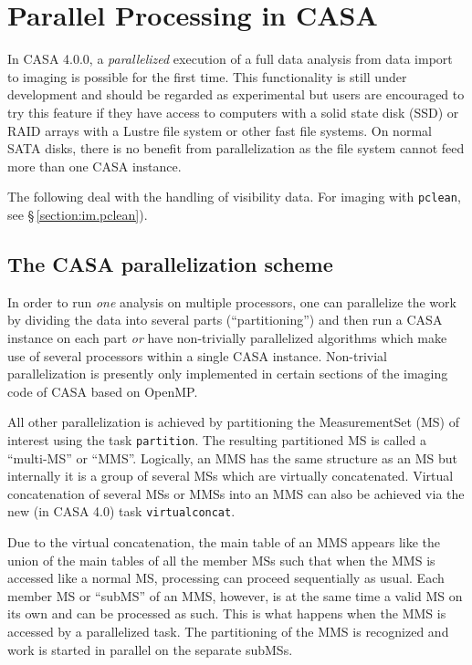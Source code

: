 
\chapter{Parallel Processing in CASA}
\label{chapter:parallel}

In CASA 4.0.0, a {\it parallelized} execution of a full data analysis from data import
to imaging is possible for the first time.
This functionality is still under development and should be regarded as experimental
but users are encouraged to try this feature if they have access to computers with
a solid state disk (SSD) or RAID arrays with a Lustre file system or other fast
file systems. On normal SATA disks, there is no benefit from parallelization as
the file system cannot feed more than one CASA instance.

The following deal with the handling of visibility data. For imaging
with {\tt pclean}, see \S\,\ref{section:im.pclean}).

\section{The CASA parallelization scheme}

In order to run {\it one} analysis on multiple processors, one can parallelize the
work by dividing the data into several parts (``partitioning'') and then
run a CASA instance on each part {\it or} have non-trivially parallelized
algorithms which make use of several processors within a single CASA instance.
Non-trivial parallelization is presently only implemented in certain sections of 
the imaging code of CASA based on OpenMP.

All other parallelization is achieved by partitioning the MeasurementSet (MS) of
interest using the task {\tt partition}. The resulting partitioned MS is called
a ``multi-MS'' or ``MMS''. Logically, an MMS has the same structure as an MS but
internally it is a group of several MSs which are virtually concatenated.
Virtual concatenation of several MSs or MMSs into an MMS can also be 
achieved via the new (in CASA 4.0) task {\tt virtualconcat}.

Due to the virtual concatenation, the main table of an MMS appears like
the union of the main tables of all the member MSs such that when the MMS
is accessed like a normal MS, processing can proceed sequentially as usual.
Each member MS or ``subMS'' of an MMS, however, is at the same time a valid MS on its own 
and can be processed as such. This is what happens when the MMS is accessed
by a parallelized task. The partitioning of the MMS is recognized and work
is started in parallel on the separate subMSs. 

